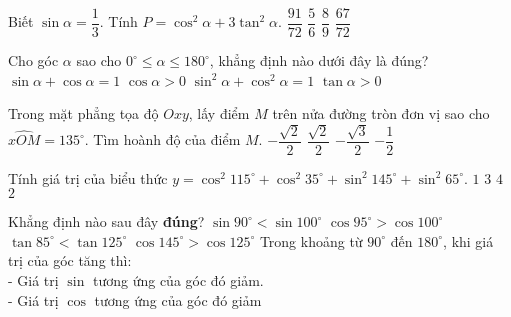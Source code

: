 \begin{ex}
	Biết $\sin\alpha=\dfrac{1}{3}$. Tính $P=\cos^2\alpha+3\tan^2\alpha$.
	\choice
	{\True $\dfrac{91}{72}$}
	{$\dfrac{5}{6}$}
	{$\dfrac{8}{9}$}
	{$\dfrac{67}{72}$}
\end{ex}
\begin{ex}
	Cho góc $\alpha$ sao cho $0^\circ\leq\alpha\leq 180^\circ$, khẳng định nào dưới đây là đúng?
	\choice
	{$\sin\alpha+\cos\alpha=1$}
	{$\cos\alpha>0$}	
	{\True $\sin^2\alpha+\cos^2\alpha=1$}
	{$\tan\alpha>0$} 
\end{ex}
\begin{ex}
	Trong mặt phẳng tọa độ $Oxy$, lấy điểm $M$ trên nửa đường tròn đơn vị sao cho $\widehat{xOM}=135^\circ$. Tìm hoành độ của điểm $M$.
	\choice
	{\True $-\dfrac{\sqrt{2}}{2}$}
	{$\dfrac{\sqrt{2}}{2}$}
	{$-\dfrac{\sqrt{3}}{2}$}
	{$-\dfrac{1}{2}$}
\end{ex}
\begin{ex}
	Tính giá trị của biểu thức $y=\cos^2 115^\circ+\cos^2 35^\circ+\sin^2 145^\circ +\sin^2 65^\circ$.
	\choice
	{$1$}
	{$3$}
	{$4$}
	{\True $2$}
\end{ex}
\begin{ex}
	Khẳng định nào sau đây \textbf{đúng}?
	\choice
	{$\sin 90^\circ <\sin 100^\circ $}
	{\True $\cos 95^\circ >\cos 100^\circ $}
	{$\tan 85^\circ <\tan 125^\circ $}
	{$\cos 145^\circ >\cos 125^\circ $}
	\loigiai
	{Trong khoảng từ $90^\circ $ đến $180^\circ $, khi giá trị của góc tăng thì:\\
		- Giá trị $\sin$ tương ứng của góc đó giảm.\\
		- Giá trị $\cos$ tương ứng của góc đó giảm}
\end{ex}
